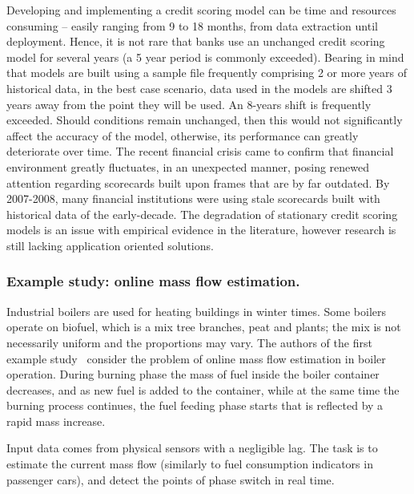 \documentclass{llncs}
\begin{document}
Developing and implementing a credit scoring model can be time and resources consuming – easily ranging from 9 to 18 months, from data extraction until deployment. Hence, it is not rare that banks use an unchanged credit scoring model for several years (a 5 year period is commonly exceeded). Bearing in mind that models are built using a sample file frequently comprising 2 or more years of historical data, in the best case scenario, data used in the models are shifted 3 years away from the point they will be used. An 8-years shift is frequently exceeded. Should conditions remain unchanged, then this would not significantly affect the accuracy of the model, otherwise, its performance can greatly deteriorate over time. The recent financial crisis came to confirm that financial environment greatly fluctuates, in an unexpected manner, posing renewed attention regarding scorecards built upon frames that are by far outdated. By 2007-2008, many financial institutions were using stale scorecards built with historical data of the early-decade. The degradation of stationary credit scoring models is an issue with empirical evidence in the literature\cite{crook92,HandA14}, however research is still lacking application oriented solutions.


\subsubsection{Example study: online mass flow estimation.}

Industrial boilers are used for heating buildings in winter times. Some boilers operate on biofuel, which is a mix tree branches, peat and  plants; the mix is not necessarily uniform and the proportions may vary. The authors of the first example study~\cite{PechenizkiySIGKDDExpl09} consider the problem of online mass flow estimation in boiler operation.
During burning phase the mass of fuel inside the boiler container decreases, and as new fuel is added to the container, while at the same time the burning process continues, the fuel feeding phase starts that is reflected by a rapid mass increase.

Input data comes from physical sensors with a negligible  lag.
The task is to estimate the current mass flow (similarly to fuel consumption indicators in passenger cars), and detect the points of phase switch in real time.

\end{document}
